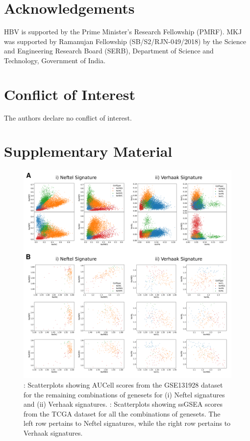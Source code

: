 \documentclass[11pt,a4paper]{article}
\newcommand{\beginsupplement}{%
        \setcounter{table}{0}
        \renewcommand{\thetable}{S\arabic{table}}%
        \setcounter{figure}{0}
        \renewcommand{\thefigure}{S\arabic{figure}}%
     }
\begin{document}
\section{Acknowledgements}
HBV is supported by the Prime Minister’s Research Fellowship (PMRF). MKJ was supported by Ramanujan Fellowship (SB/S2/RJN-049/2018) by the Science and Engineering Research Board (SERB), Department of Science and Technology, Government of India.

\section{Conflict of Interest}
The authors declare no conflict of interest.

\printbibliography 

\newpage
\section{Supplementary Material}
\beginsupplement

\begin{figure}[h]
    \begin{subfigure}[c]{\textwidth}
        \label{auscattersupp}
    \end{subfigure}
    \begin{subfigure}[c]{\textwidth}
        \label{ssgseascatter}
    \end{subfigure}
    \centering
    \includegraphics[width=\textwidth]{figures/FigureS1}
    \caption{: Scatterplots showing AUCell scores from the GSE131928 dataset for the remaining combinations of genesets for (i) Neftel signatures and (ii) Verhaak signatures. : Scatterplots showing ssGSEA scores from the TCGA dataset for all the combinations of genesets. The left row pertains to Neftel signatures, while the right row pertains to Verhaak signatures.}
    \label{ssgseasupp}
\end{figure}
\end{document}
